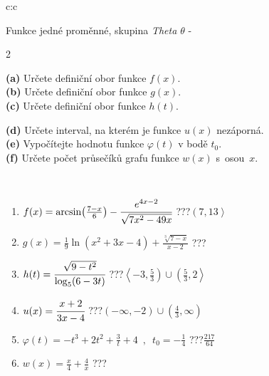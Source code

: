 \documentclass[10pt]{report}
\begin{document}
\begin{tabular}{c:c}
\begin{minipage}[c][104.5mm][t]{0.5\linewidth}
\begin{center}
\vspace{7mm}
{\huge Funkce jedné proměnné, skupina \textit{Theta $\theta$} -}\\[5mm]
\begin{minipage}{0.95\linewidth}
\begin{center}
{\small \begin{multicols}{2} \raggedright
\textbf{(a)} Určete definiční obor funkce \(f(x)\). \\[1mm]
\textbf{(b)} Určete definiční obor funkce \(g(x)\). \\[1mm]
\textbf{(c)} Určete definiční obor funkce \(h(t)\). \par \columnbreak
\textbf{(d)} Určete interval, na kterém je funkce \(u(x)\) nezáporná. \\[1mm]
\textbf{(e)} Vypočítejte hodnotu funkce \(\varphi(t)\) v bodě \(t_0\). \\[1mm]
\textbf{(f)} Určete počet průsečíků grafu funkce \(w(x)\) s~osou~\(x\). \\[1mm]
\end{multicols}
}
\end{center}
\end{minipage}
\\[4mm]
\begin{minipage}{0.79\linewidth}
\begin{center}
\begin{varwidth}{\linewidth}
\begin{enumerate}
\small
\item $f(x) = \arcsin\!\left( \frac{7-x}{6} \right) - \cfrac{e^{4x-2}}{\sqrt{7x^2-49x}}$\quad \dotfill\; ???\;\dotfill \quad $\left(7 , 13\right\rangle$
\item $g(x) = \frac{1}{9} \ln{\!(x^2+3x-4)}+\frac{\sqrt[3]{7-x}}{x-2}$\quad \dotfill\; ???\;\dotfill {}
\item $h(t) = \cfrac{\sqrt{9-t^2}}{\log_5(6-3t)}$\quad \dotfill\; ???\;\dotfill \quad $\left\langle-3 , \frac{5}{3}\right)\cup\left(\frac{5}{3} , 2\right\rangle$
\item $u(x) = \cfrac{x+2}{3x-4}$\quad \dotfill\; ???\;\dotfill \quad $\left(-\infty , -2\right)\cup\left(\frac{4}{3} , \infty\right)$
\item $\varphi(t) = -t^3+2t^2+\frac{3}{t}+4 \enspace , \enspace t_0=-\frac{1}{4}$\quad \dotfill\; ???\;\dotfill \quad $\frac{217}{64}$
\item $w(x) = \frac{x}{4}+\frac{4}{x}$\quad \dotfill\; ???\;\dotfill {}

\end{enumerate}
\end{varwidth}
\end{center}
\end{minipage}
\end{center}
\end{minipage}
\end{tabular}
\end{document}
